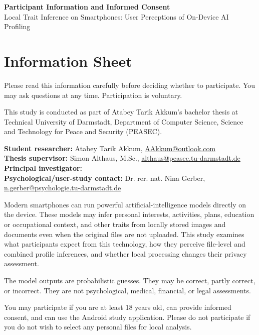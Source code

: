 \documentclass[10pt,a4paper]{article}
\begin{document}
\begin{center}
  {\Large\bfseries Participant Information and Informed Consent}\\[0.3em]
  {\large Local Trait Inference on Smartphones: User Perceptions of On-Device AI Profiling}
\end{center}
\draftbanner

\section*{Information Sheet}
Please read this information carefully before deciding whether to participate. You may ask questions at any time. Participation is voluntary.

This study is conducted as part of Atabey Tarik Akkum's bachelor thesis at Technical University of Darmstadt, Department of Computer Science, Science and Technology for Peace and Security (PEASEC).

\textbf{Student researcher:} Atabey Tarik Akkum, \href{mailto:AAkkum@outlook.com}{AAkkum@outlook.com}\\
\textbf{Thesis supervisor:} Simon Althaus, M.Sc., \href{mailto:althaus@peasec.tu-darmstadt.de}{althaus@peasec.tu-darmstadt.de}\\
\textbf{Principal investigator:} \\
\textbf{Psychological/user-study contact:} Dr. rer. nat. Nina Gerber, \href{mailto:n.gerber@psychologie.tu-darmstadt.de}{n.gerber@psychologie.tu-darmstadt.de} 

Modern smartphones can run powerful artificial-intelligence models directly on the device. These models may infer personal interests, activities, plans, education or occupational context, and other traits from locally stored images and documents even when the original files are not uploaded. This study examines what participants expect from this technology, how they perceive file-level and combined profile inferences, and whether local processing changes their privacy assessment.

The model outputs are probabilistic guesses. They may be correct, partly correct, or incorrect. They are not psychological, medical, financial, or legal assessments.

You may participate if you are at least 18 years old, can provide informed consent, and can use the Android study application. Please do not participate if you do not wish to select any personal files for local analysis.
\end{document}
